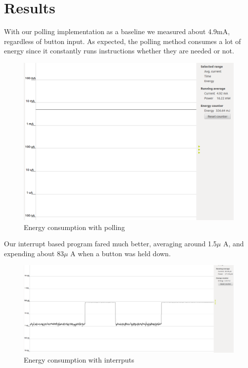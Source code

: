 \chapter{Results}

With our polling implementation as a baseline we measured about 4.9mA, regardless of button input. As expected, the polling method consumes a lot of energy since it constantly runs instructions whether they are needed or not.

\begin{figure}[ht]
 \centering
 \includegraphics[width=\textwidth]{images/performance_with_polling.png}
 \caption{Energy consumption with polling}
\end{figure}

Our interrupt based program fared much better, averaging around 1.5$\mu$ A, and expending about 83$\mu$ A when a button was held down.

\begin{figure}[ht]
 \centering
 \includegraphics[width=\textwidth]{images/performance_with_interrputs.png}
 \caption{Energy consumption with interrputs}
\end{figure}


